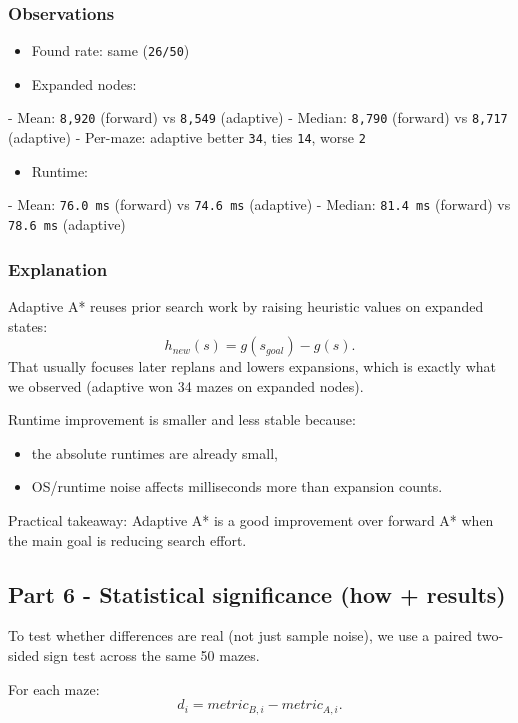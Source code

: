 \documentclass[11pt]{article}
\begin{document}
\subsubsection*{Observations}

\begin{itemize}[leftmargin=*]
\item Found rate: same (\texttt{26/50})
\item Expanded nodes:
\end{itemize}
  - Mean: \texttt{8,920} (forward) vs \texttt{8,549} (adaptive)
  - Median: \texttt{8,790} (forward) vs \texttt{8,717} (adaptive)
  - Per-maze: adaptive better \texttt{34}, ties \texttt{14}, worse \texttt{2}
\begin{itemize}[leftmargin=*]
\item Runtime:
\end{itemize}
  - Mean: \texttt{76.0 ms} (forward) vs \texttt{74.6 ms} (adaptive)
  - Median: \texttt{81.4 ms} (forward) vs \texttt{78.6 ms} (adaptive)

\subsubsection*{Explanation}

Adaptive A* reuses prior search work by raising heuristic values on expanded states:
\[
h_{new}(s)=g(s_{goal})-g(s).
\]
That usually focuses later replans and lowers expansions, which is exactly what we observed (adaptive won 34 mazes on expanded nodes).

Runtime improvement is smaller and less stable because:
\begin{itemize}[leftmargin=*]
\item the absolute runtimes are already small,
\item OS/runtime noise affects milliseconds more than expansion counts.
\end{itemize}

Practical takeaway: Adaptive A* is a good improvement over forward A* when the main goal is reducing search effort.

\subsection*{Part 6 - Statistical significance (how + results)}

To test whether differences are real (not just sample noise), we use a paired two-sided sign test across the same 50 mazes.

For each maze:
\[
d_i = metric_{B,i} - metric_{A,i}.
\]
\end{document}
